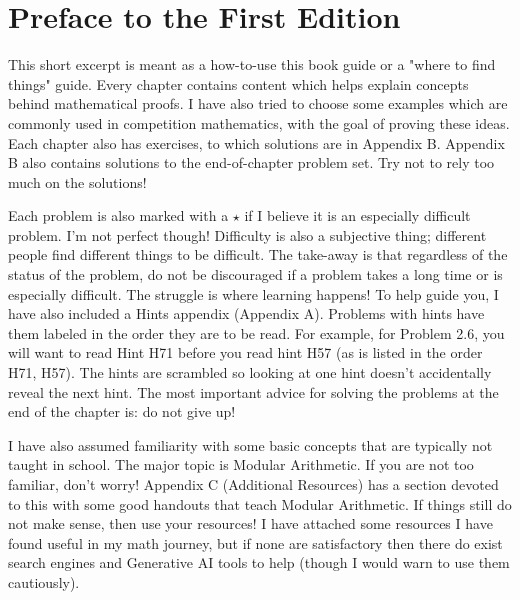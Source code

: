 \frontmatter

\maketitle
\thispagestyle{empty}

\newpage
\tableofcontents

\newpage
\chapter*{Preface to the First Edition}

This short excerpt is meant as a how-to-use this book guide or a "where to find things" guide. Every chapter contains content which helps explain concepts behind mathematical proofs. I have also tried to choose some examples which are commonly used in competition mathematics, with the goal of proving these ideas. Each chapter also has exercises, to which solutions are in Appendix B. Appendix B also contains solutions to the end-of-chapter problem set. Try not to rely too much on the solutions!

Each problem is also marked with a $\star$ if I believe it is an especially difficult problem. I'm not perfect though! Difficulty is also a subjective thing; different people find different things to be difficult. The take-away is that regardless of the status of the problem, do not be discouraged if a problem takes a long time or is especially difficult. The struggle is where learning happens! To help guide you, I have also included a Hints appendix (Appendix A). Problems with hints have them labeled in the order they are to be read. For example, for Problem 2.6, you will want to read Hint H71 before you read hint H57 (as is listed in the order H71, H57). The hints are scrambled so looking at one hint doesn't accidentally reveal the next hint. The most important advice for solving the problems at the end of the chapter is: do not give up!

I have also assumed familiarity with some basic concepts that are typically not taught in school. The major topic is Modular Arithmetic. If you are not too familiar, don't worry! Appendix C (Additional Resources) has a section devoted to this with some good handouts that teach Modular Arithmetic. If things still do not make sense, then use your resources! I have attached some resources I have found useful in my math journey, but if none are satisfactory then there do exist search engines and Generative AI tools to help (though I would warn to use them cautiously). 


